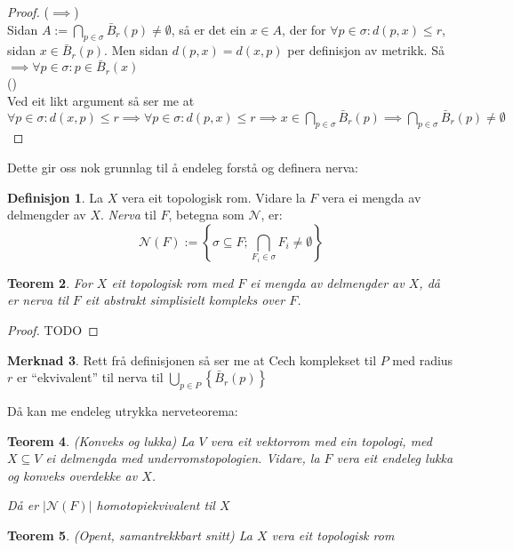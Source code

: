 \documentclass[a4paper, titlepage, 12pt, norsk]{article}
\theoremstyle{plain}
\newtheorem{theorem}{Teorem}[section]
\theoremstyle{definition}
\newtheorem{definition}[theorem]{Definisjon}
\newtheorem{remark}[theorem]{Merknad}
\newcommand{\Nc}{\mathcal{N}}
\begin{document}
\begin{proof}
	($\implies$)
	\\Sidan $A:=\bigcap_{p\in\sigma}\bar{B}_r(p)\neq\emptyset$, så er det ein $x\in A$, der for $\forall p\in\sigma: d(p,x)\leq r$, sidan $x\in\bar{B}_r(p)$.
	Men sidan $d(p,x)=d(x,p)$ per definisjon av metrikk. 
	Så $\implies \forall p\in\sigma: p \in \bar{B}_r(x)$
	\\(\Leftarrow)
	\\Ved eit likt argument så ser me at  $\forall p \in \sigma : d(x, p) \leq r \implies \forall p \in \sigma : d(p, x) \leq r \implies x \in \bigcap_{p \in \sigma} \bar{B}_r(p) \implies \bigcap_{p \in \sigma} \bar{B}_r(p) \neq \emptyset$
\end{proof}
Dette gir oss nok grunnlag til å endeleg forstå og definera nerva:
\begin{definition}
	La $X$ vera eit topologisk rom. Vidare la $F$ vera ei mengda av delmengder av $X$. \emph{Nerva} til $F$, betegna som $\Nc$, er:
	\begin{equation*}
		\Nc(F) := \left \{ \sigma \subseteq F ; \bigcap_{ F_i \in \sigma } F_i \neq \emptyset \right \}
	\end{equation*}
\end{definition}
\begin{theorem}
	For $X$ eit topologisk rom med $F$ ei mengda av delmengder av $X$, då er nerva til $F$ eit abstrakt simplisielt kompleks over $F$.
\end{theorem}
\begin{proof}
	TODO
\end{proof}
\begin{remark}
	Rett frå definisjonen så ser me at Cech komplekset til $P$ med radius $r$ er ``ekvivalent'' til nerva til $\bigcup_{p \in P} \left \{ \bar{B}_r(p) \right \}$
\end{remark}
Då kan me endeleg utrykka nerveteorema:
\begin{theorem}
	(Konveks og lukka) La $V$ vera eit vektorrom med ein topologi, med $X\subseteq V$ ei delmengda med underromstopologien. Vidare, la $F$ vera eit endeleg lukka og konveks overdekke av $X$.
	
	Då er $|\Nc(F)|$ homotopiekvivalent til $X$
\end{theorem}
\begin{theorem}
	(Opent, samantrekkbart snitt) La $X$ vera eit topologisk rom
\end{theorem}
\end{document}
